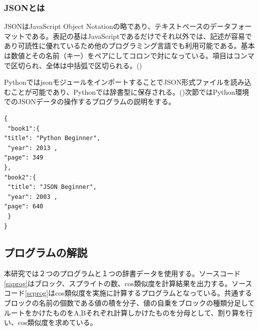 \documentclass[a4paper,10pt,onecolumn,oneside,openany]{jsbook}
\begin{document}
\subsubsection{JSONとは}
JSONはJavaScript Object Notationの略であり、テキストベースのデータフォーマットである。表記の基はJavaScriptであるだけでそれ以外では、記述が容易であり可読性に優れているため他のプログラミング言語でも利用可能である。基本は数値とその名前（キー）をペアにしてコロンで対になっている。項目はコンマで区切られ、全体は中括弧で区切られる。(\cite{json})

PythonではjsonモジュールをインポートすることでJSON形式ファイルを読み込むことが可能であり、Pythonでは辞書型に保存される。(\cite{json_py})次節ではPython環境でのJSONデータの操作するプログラムの説明をする。

 \begin{lstlisting}[caption=JSON,label=json]
 {
 "book1":{
"title": "Python Beginner",
 "year": 2013 ,
"page": 349
},
"book2":{
 "title": "JSON Beginner",
 "year": 2003 ,
"page": 640
 }
}
 \end{lstlisting}
 
\subsection{プログラムの解説}
本研究では２つのプログラムと１つの辞書データを使用する。ソースコード\ref{saprog}はブロック、スプライトの数、cos類似度を計算結果を出力する。ソースコード\ref{scprog}はcos類似度を実施に計算するプログラムとなっている。共通するブロックの名前の個数である値の積を分子、値の自乗をブロックの種類分足してルートをかけたものをA,Bそれぞれ計算しかけたものを分母として、割り算を行い、cos類似度を求めている。
\end{document}
